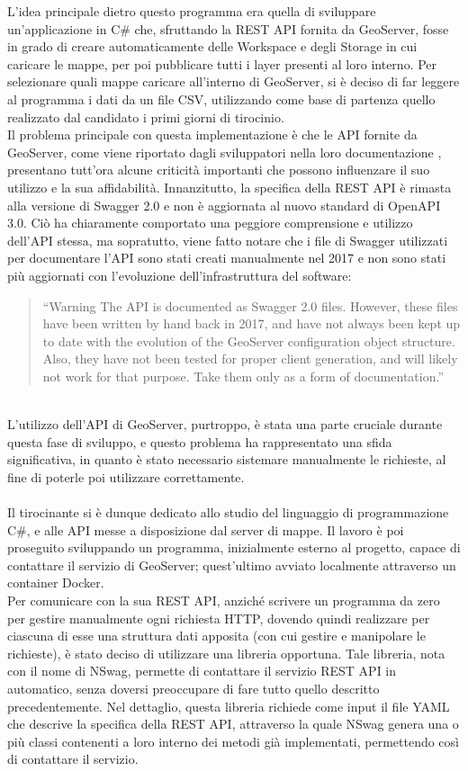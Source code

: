 L'idea principale dietro questo programma era quella di sviluppare un'applicazione in C\# che, sfruttando la REST API fornita da GeoServer, fosse in grado di creare automaticamente delle Workspace e degli Storage in cui caricare le mappe, per poi pubblicare tutti i layer presenti al loro interno. Per selezionare quali mappe caricare all'interno di GeoServer, si è deciso di far leggere al programma i dati da un file CSV, utilizzando come base di partenza quello realizzato dal candidato i primi giorni di tirocinio.
\\Il problema principale con questa implementazione è che le API fornite da GeoServer, come viene riportato dagli sviluppatori nella loro documentazione \cite{DocumentazioneGeoServerAPI}, presentano tutt'ora alcune criticità importanti che possono influenzare il suo utilizzo e la sua affidabilità. Innanzitutto, la specifica della REST API è rimasta alla versione di Swagger 2.0 e non è aggiornata al nuovo standard di OpenAPI 3.0. Ciò ha chiaramente comportato una peggiore comprensione e utilizzo dell'API stessa, ma sopratutto, viene fatto notare che i file di Swagger utilizzati per documentare l'API sono stati creati manualmente nel 2017 e non sono stati più aggiornati con l'evoluzione dell'infrastruttura del software: 
\begin{quote}
``Warning The API is documented as Swagger 2.0 files. However, these files have been written by hand back in 2017, and have not always been kept up to date with the evolution of the GeoServer configuration object structure. Also, they have not been tested for proper client generation, and will likely not work for that purpose. Take them only as a form of documentation.''
\end{quote}
\\L'utilizzo dell'API di GeoServer, purtroppo, è stata una parte cruciale durante questa fase di sviluppo, e questo problema ha rappresentato una sfida significativa, in quanto è stato necessario sistemare manualmente le richieste, al fine di poterle poi utilizzare correttamente.
\\~\\
Il tirocinante si è dunque dedicato allo studio del linguaggio di programmazione C\#, e alle API messe a disposizione dal server di mappe. Il lavoro è poi proseguito sviluppando un programma, inizialmente esterno al progetto, capace di contattare il servizio di GeoServer; quest'ultimo avviato localmente attraverso un container Docker.
\\Per comunicare con la sua REST API, anziché scrivere un programma da zero per gestire manualmente ogni richiesta HTTP, dovendo quindi realizzare per ciascuna di esse una struttura dati apposita (con cui gestire e manipolare le richieste), è stato deciso di utilizzare una libreria opportuna. Tale libreria, nota con il nome di NSwag, permette di contattare il servizio REST API in automatico, senza doversi preoccupare di fare tutto quello descritto precedentemente. Nel dettaglio, questa libreria richiede come input il file YAML che descrive la specifica della REST API, attraverso la quale NSwag genera una o più classi contenenti a loro interno dei metodi già implementati, permettendo così di contattare il servizio.
